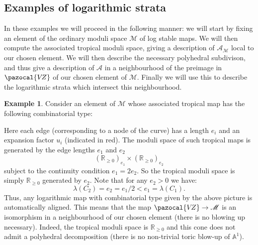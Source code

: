 \documentclass[11pt]{amsart}
\newcommand{\mathsq}[1]{#1}
\newcommand{\PP}{\mathbb P}
\newcommand{\VZ}{\pazocal{V\!Z}}
\renewcommand{\to}{\rightarrow}
\newcommand{\Aaff}{\mathbb{A}}
\newcommand{\Acal}{\mathcal{A}}
\newcommand{\Mcal}{\mathcal{M}}
\newcommand{\RR}{\mathbb{R}}
\theoremstyle{definition}
\theoremstyle{definition}
\newtheorem{example}[thm]{Example}
\begin{document}
\subsection{Examples of logarithmic strata} In these examples we will proceed in the following manner: we will start by fixing an element of the ordinary moduli space $\Mcal$ of log stable maps. We will then compute the associated tropical moduli space, giving a description of $\Acal_\Mcal$ local to our chosen element. We will then describe the necessary polyhedral subdivison, and thus give a description of $\Acal$ in a neighbourhood of the preimage in $\VZ$ of our chosen element of $\Mcal$. Finally we will use this to describe the logarithmic strata which intersect this neighbourhood.
\begin{example} Consider an element of $\Mcal$ whose associated tropical map has the following combinatorial type:
\begin{center}
\end{center}
Here each edge (corresponding to a node of the curve) has a length $e_i$ and an expansion factor $u_i$ (indicated in red). The moduli space of such tropical maps is generated by the edge lengths $e_1$ and $e_2$
\begin{equation*} (\RR_{\geq 0})_{e_1} \times (\RR_{\geq 0})_{e_2} \end{equation*}
subject to the continuity condition $e_1=2e_2$. So the tropical moduli space is simply $\RR_{\geq 0}$ generated by $e_2$. Note that for any $e_2 > 0$ we have:
\begin{equation*} \lambda(\mathsq{C}_2) = e_2 = e_1/2 < e_1 = \lambda(\mathsq{C}_1). \end{equation*}
Thus, any logarithmic map with combinatorial type given by the above picture is automatically aligned. This means that the map $\VZ \to \Mcal$ is an isomorphism in a neighbourhood of our chosen element (there is no blowing up necessary). Indeed, the tropical moduli space is $\RR_{\geq 0}$ and this cone does not admit a polyhedral decomposition (there is no non-trivial toric blow-up of $\Aaff^1$).
\end{example}
\end{document}
